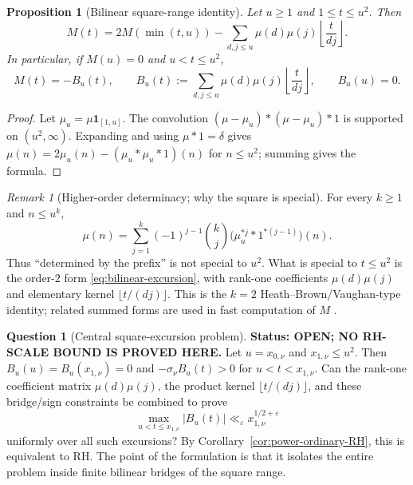 \documentclass[11pt]{amsart}
\numberwithin{equation}{section}
\theoremstyle{plain}
\newtheorem{proposition}[theorem]{Proposition}
\theoremstyle{definition}
\newtheorem{question}[theorem]{Question}
\theoremstyle{remark}
\newtheorem{remark}[theorem]{Remark}
\begin{document}
\begin{proposition}[Bilinear square-range identity]
\label{prop:prefix-bilinear}
Let $u\ge1$ and $1\le t\le u^2$. Then
\begin{equation}
\label{eq:bilinear-general}
M(t)=2M(\min(t,u))-
\sum_{d,j\le u}\mu(d)\mu(j)\left\lfloor\frac{t}{dj}\right\rfloor.
\end{equation}
In particular, if $M(u)=0$ and $u<t\le u^2$,
\begin{equation}
\label{eq:bilinear-excursion}
M(t)=-B_u(t),\qquad
B_u(t):=\sum_{d,j\le u}\mu(d)\mu(j)
\left\lfloor\frac{t}{dj}\right\rfloor,
\qquad B_u(u)=0.
\end{equation}
\end{proposition}

\begin{proof}
Let $\mu_u=\mu\mathbf1_{[1,u]}$. The convolution
$(\mu-\mu_u)*(\mu-\mu_u)*1$ is supported on $(u^2,\infty)$. Expanding and
using $\mu*1=\delta$ gives
$\mu(n)=2\mu_u(n)-(\mu_u*\mu_u*1)(n)$ for $n\le u^2$; summing gives the
formula.
\end{proof}

\begin{remark}[Higher-order determinacy; why the square is special]
\label{rem:prefix-k}
For every $k\ge1$ and $n\le u^k$,
\begin{equation}
\label{eq:HB-k}
\mu(n)=\sum_{j=1}^{k}(-1)^{j-1}\binom{k}{j}
\bigl(\mu_u^{*j}*1^{*(j-1)}\bigr)(n).
\end{equation}
Thus ``determined by the prefix'' is not special to $u^2$. What is special
to $t\le u^2$ is the order-$2$ form \eqref{eq:bilinear-excursion}, with
rank-one coefficients $\mu(d)\mu(j)$ and elementary kernel
$\lfloor t/(dj)\rfloor$. This is the $k=2$ Heath--Brown/Vaughan-type
identity; related summed forms are used in fast computation of $M$
\cite{HB82,HT23}.
\end{remark}

\begin{question}[Central square-excursion problem]
\label{q:excursion-constraint}
\textbf{Status: OPEN; NO RH-SCALE BOUND IS PROVED HERE.} Let $u=x_{0,\nu}$ and $x_{1,\nu}\le u^2$. Then
$B_u(u)=B_u(x_{1,\nu})=0$ and $-\sigma_\nu B_u(t)>0$ for
$u<t<x_{1,\nu}$. Can the rank-one coefficient matrix $\mu(d)\mu(j)$, the
product kernel $\lfloor t/(dj)\rfloor$, and these bridge/sign constraints be
combined to prove
\[
\max_{u<t\le x_{1,\nu}}|B_u(t)|
\ll_\varepsilon x_{1,\nu}^{1/2+\varepsilon}
\]
uniformly over all such excursions? By
Corollary~\ref{cor:power-ordinary-RH}, this is equivalent to RH. The point of
the formulation is that it isolates the entire problem inside finite
bilinear bridges of the square range.
\end{question}
\end{document}
